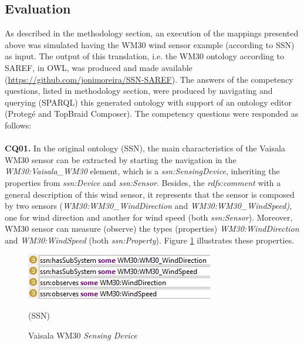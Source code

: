 \documentclass{sig-alternate-05-2015}
\begin{document}
\subsection{Evaluation}
As described in the methodology section, an execution of the mappings presented above was simulated having the WM30 wind sensor example (according to SSN) as input. The output of this translation, i.e. the WM30 ontology according to SAREF, in OWL, was produced and made available (\url{https://github.com/jonimoreira/SSN-SAREF}). The answers of the competency questions, listed in methodology section, were produced by navigating and querying (SPARQL) this generated ontology with support of an ontology editor (Protegé and TopBraid Composer). The competency questions were responded as follows:
\\\\\textbf{CQ01.} In the original ontology (SSN), the main characteristics of the Vaisala WM30 sensor can be extracted by starting the navigation in the \textit{WM30:\-Vaisala\-\_WM30} element, which is a \textit{ssn:\-SensingDevice}, inheriting the properties from \textit{ssn:\-Device} and \textit{ssn:\-Sensor}. Besides, the \textit{rdfs:comment} with a general description of this wind sensor, it represents that the sensor is composed by two sensors (\textit{WM30:\-WM30\-\_Wind\-Direction} and \textit{WM30:\-WM30\-\_WindSpeed)}, one for wind direction and another for wind speed (both \textit{ssn:\-Sensor}). Moreover, WM30 sensor can measure (observe) the types (properties) \textit{WM30:\-WindDirection} and \textit{WM30:\-WindSpeed} (both \textit{ssn:\-Property}). Figure \ref{fig:SSN_SystemProperties} illustrates these properties.

\begin{figure}[h!]
\centering
\includegraphics[scale=0.98]{SSN_SystemProperties}
\caption{Vaisala WM30 \textit{Sensing Device}} (SSN)
\label{fig:SSN_SystemProperties}
\end{figure}
\end{document}
